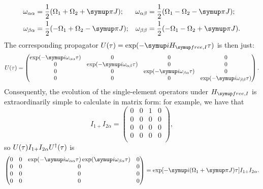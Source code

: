\begin{equation}
    \label{eq:state_precessions}
    \begin{aligned}
        \omega_{\alpha\alpha} &= \frac{1}{2}(\Omega_1 + \Omega_2 + \cpi J); &
        \omega_{\alpha\beta} &= \frac{1}{2}(\Omega_1 - \Omega_2 - \cpi J); \\
        \omega_{\beta\alpha} &= \frac{1}{2}(-\Omega_1 + \Omega_2 - \cpi J); &
        \omega_{\beta\beta} &= \frac{1}{2}(-\Omega_1 - \Omega_2 + \cpi J).
    \end{aligned}
\end{equation}
The corresponding propagator $U(\tau) = \exp(-\mi\HfreeI\tau)$ is then just:
\begin{equation}
    \label{eq:u_free_weak}
    U(\tau) = \begin{pmatrix}
        \exp(-\mi\omega_{\alpha\alpha}\tau) & 0 & 0 & 0 \\
        0 & \exp(-\mi\omega_{\alpha\beta}\tau) & 0 & 0 \\
        0 & 0 & \exp(-\mi\omega_{\beta\alpha}\tau) & 0 \\
        0 & 0 & 0 & \exp(-\mi\omega_{\beta\beta}\tau) \\
    \end{pmatrix}.
\end{equation}
Consequently, the evolution of the single-element operators under $\HfreeI$ is extraordinarily simple to calculate in matrix form: for example, we have that
\begin{equation}
    \label{eq:single_elem_plusalpha_evolution}
    I_{1+}I_{2\alpha} = \begin{pmatrix}
        0 & 0 & 1 & 0 \\
        0 & 0 & 0 & 0 \\
        0 & 0 & 0 & 0 \\
        0 & 0 & 0 & 0 \\
    \end{pmatrix},
\end{equation}
so $U(\tau) I_{1+} I_{2\alpha} U^\dagger(\tau)$ is
\begin{equation}
    \label{eq:single_elem_plusalpha_evolution_2}
    \begin{pmatrix}
        0 & 0 & \exp(-\mi\omega_{\alpha\alpha}\tau)\exp(\mi\omega_{\beta\alpha}\tau) & 0 \\
        0 & 0 & 0 & 0 \\
        0 & 0 & 0 & 0 \\
        0 & 0 & 0 & 0 \\
    \end{pmatrix} = \exp[-\mi(\Omega_1 + \cpi J)\tau] I_{1+}I_{2\alpha}.
\end{equation}
